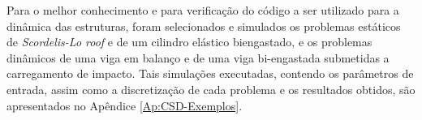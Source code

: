 Para o melhor conhecimento e para verificação do código a ser utilizado para a dinâmica das estruturas, foram selecionados e simulados os problemas estáticos de \textit{Scordelis-Lo roof} e de um cilindro elástico biengastado, e os problemas dinâmicos de uma viga em balanço e de uma viga bi-engastada submetidas a carregamento de impacto. Tais simulações executadas, contendo os parâmetros de entrada, assim como a discretização de cada problema e os resultados obtidos, são apresentados no Apêndice \ref{Ap:CSD-Exemplos}. %